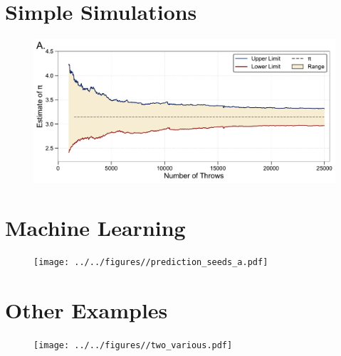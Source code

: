 \documentclass[12pt]{beamer}
\begin{document}
\section{Simple Simulations}
\begin{frame}
\begin{center}
\begin{figure}
	\includegraphics[width=\textwidth]{../../figures//buffon_seeds.pdf}
\end{figure}
\end{center}
\end{frame}

\section{Machine Learning}
\begin{frame}
\begin{center}
\begin{figure}
	\texttt{[image: ../../figures//prediction\_seeds\_a.pdf]}
\end{figure}
\end{center}
\end{frame}

\section{Other Examples}
\begin{frame}
\begin{center}
\begin{figure}
	\texttt{[image: ../../figures//two\_various.pdf]}
\end{figure}
\end{center}
\end{frame}
\end{document}
